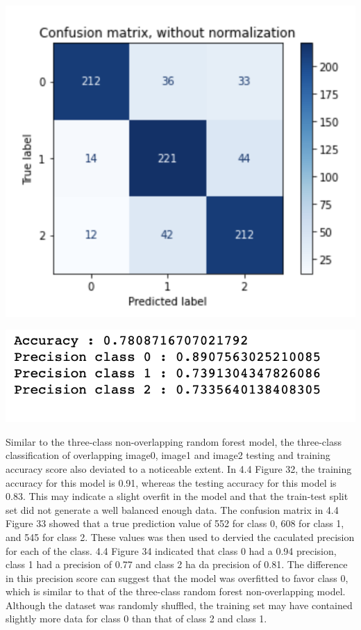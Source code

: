 \documentclass[12pt]{article}
\begin{document}
\begin{multicols*}{2}
\begin{center}
		\includegraphics[scale=0.5]{../screenshot/Rf-Non-Overlapping012/cf.png}

		\includegraphics[scale=0.5]{../screenshot/Rf-Non-Overlapping012/calc_score.png}
  \end{center}


  \hspace*{5mm} Similar to the three-class non-overlapping random forest model, the three-class classification of overlapping 
  image0, image1 and image2 testing and training accuracy score also deviated to a noticeable extent.
  In 4.4 Figure 32, the training accuracy for this model is 0.91, whereas the testing accuracy for this model is 
  0.83. This may indicate a slight overfit in the model and that the train-test split set did not generate a well balanced enough data.
  The confusion matrix in 4.4 Figure 33 showed that a true prediction value of 552 for class 0, 608 for class 1, and 545 for class 2.
  These values was then used to dervied the caculated precision for each of the class. 4.4 Figure 34 indicated that class 0 had a 0.94 precision,
  class 1 had a precision of 0.77 and class 2 ha da precision of 0.81. The difference in this precision score can suggest that the model
  was overfitted to favor class 0, which is similar to that of the three-class random forest non-overlapping model. Although the dataset was 
  randomly shuffled, the training set may have contained slightly more data for class 0 than that of class 2 and class 1.  


\end{multicols*}
\end{document}

